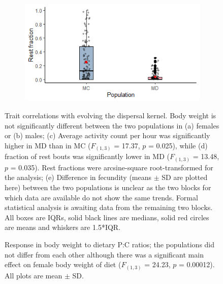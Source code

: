 \documentclass[12pt,onecolumn,twoside]{article}
\begin{document}
\begin{figure}
\begin{subfigure}{0.49\textwidth}
			\subcaption{\label{fig2c}\empty}
		\end{subfigure}
		\begin{subfigure}{0.49\textwidth}
			\includegraphics[width=\textwidth, keepaspectratio]{fig1f.png}
			\subcaption{\label{fig2d}\empty}
		\end{subfigure}
		\begin{subfigure}{0.49\textwidth}
			\centering
			\scalebox{0.6}{}
			\subcaption{\label{fig2e}\empty}
		\end{subfigure}
		\caption{\label{fig2} Trait correlations with evolving the dispersal kernel. Body weight is not significantly different between the two populations in (a) females or (b) males; (c) Average activity count per hour was significantly higher in MD than in MC ($F_{(1, 3)}$ = 17.37, $p$ = 0.025), while (d) fraction of rest bouts was significantly lower in MD ($F_{(1, 3)}$ = 13.48, $p$ = 0.035). Rest fractions were arcsine-square root-transformed for the analysis; (e) Difference in fecundity (means $\pm$ SD are plotted here) between the two populations is unclear as the two blocks for which data are available do not show the same trends. Formal statistical analysis is awaiting data from the remaining two blocks. All boxes are IQRs, solid black lines are medians, solid red circles are means and whiskers are 1.5*IQR.}
	\end{figure}
	\begin{figure}
		\centering
		\scalebox{0.7}{}
		\caption{\label{fig3} Response in body weight to dietary P:C ratios; the populations did not differ from each other although there was a significant main effect on female body weight of diet ($F_{(1, 3)}$ = 24.23, $p$ = 0.00012). All plots are mean $\pm$ SD.}
	\end{figure}
\end{document}
